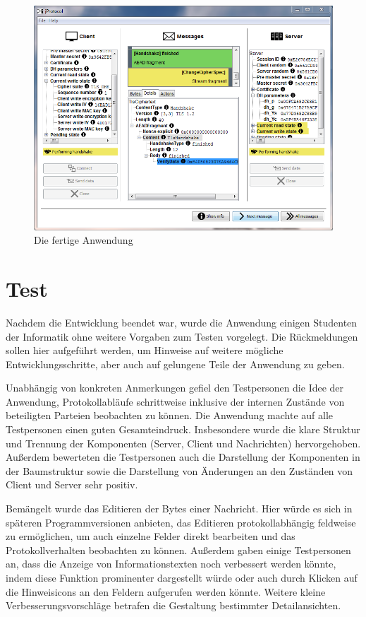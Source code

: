 \begin{figure}
	\centering
	\includegraphics[scale=0.7]{Diagrams/ScreenshotTLS.png} 
	\caption{Die fertige Anwendung}
	\label{fig_application_screenshot}
\end{figure}

\section{Test}
\label{sec_impl_test}
Nachdem die Entwicklung beendet war, wurde die Anwendung einigen Studenten der Informatik ohne weitere Vorgaben zum Testen vorgelegt. Die Rückmeldungen sollen hier aufgeführt werden, um Hinweise auf weitere mögliche Entwicklungsschritte, aber auch auf gelungene Teile der Anwendung zu geben.

Unabhängig von konkreten Anmerkungen gefiel den Testpersonen die Idee der Anwendung, Protokollabläufe schrittweise inklusive der internen Zustände von beteiligten Parteien beobachten zu können. Die Anwendung machte auf alle Testpersonen einen guten Gesamteindruck. Insbesondere wurde die klare Struktur und Trennung der Komponenten (Server, Client und Nachrichten) hervorgehoben. Außerdem bewerteten die Testpersonen auch die Darstellung der Komponenten in der Baumstruktur sowie die Darstellung von Änderungen an den Zuständen von Client und Server sehr positiv.

Bemängelt wurde das Editieren der Bytes einer Nachricht. Hier würde es sich in späteren Programmversionen anbieten, das Editieren protokollabhängig feldweise zu ermöglichen, um auch einzelne Felder direkt bearbeiten und das Protokollverhalten beobachten zu können. 
Außerdem gaben einige Testpersonen an, dass die Anzeige von Informationstexten noch verbessert werden könnte, indem diese Funktion prominenter dargestellt würde oder auch durch Klicken auf die Hinweisicons an den Feldern aufgerufen werden könnte.
Weitere kleine Verbesserungsvorschläge betrafen die Gestaltung bestimmter Detailansichten.